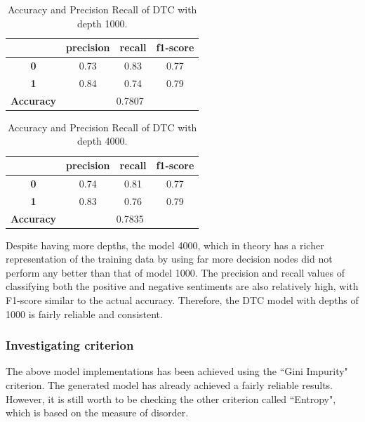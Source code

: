 \documentclass[a4paper]{report}
\begin{document}
{{\begin{table}[h!]
\centering
\begin{tabular}{  c | c | c | c |}
\cline{2-4}
&  \textbf { precision } &  \textbf  { recall } & \textbf  { f1-score } \\
\hline
\multicolumn{1}{|c|}{ \textbf {0}} & 0.73 & 0.83 & 0.77 \\
\hline
\multicolumn{1}{|c|}{ \textbf {1}} & 0.84 & 0.74 & 0.79 \\
\hline
\hline
\multicolumn{1}{|c|}{ \textbf {Accuracy}} & \multicolumn{3}{|c|}{0.7807} \\
\hline
\end{tabular}
\caption{Accuracy and Precision Recall of DTC with depth 1000.}
\label{table:DTC_depth_1000_performance}
\end{table}


\begin{table}[h!]
\centering
\begin{tabular}{  c | c | c | c |}
\cline{2-4}
&  \textbf { precision } &  \textbf  { recall } & \textbf  { f1-score }  \\
\hline
\multicolumn{1}{|c|}{ \textbf {0}} & 0.74 & 0.81 & 0.77 \\
\hline
\multicolumn{1}{|c|}{ \textbf {1}} & 0.83 & 0.76 & 0.79 \\
\hline
\hline
\multicolumn{1}{|c|}{ \textbf {Accuracy}} & \multicolumn{3}{|c|}{0.7835} \\
\hline
\end{tabular}
\caption{Accuracy and Precision Recall of DTC with depth 4000.}
\label{table:DTC_depth_4000_performance}
\end{table}

\noindent
Despite having more depths, the model 4000, which in theory has a richer representation of the training data by using far more decision nodes did not perform any better than that of model 1000. The precision and recall values of classifying both the positive and negative sentiments are also relatively high, with F1-score similar to the actual accuracy. Therefore, the DTC model with depths of 1000 is fairly reliable and consistent.

\subsubsection{Investigating criterion}
The above model implementations has been achieved using the “Gini Impurity" criterion. The generated model has already achieved a fairly reliable results. However, it is still worth to be checking the other criterion called “Entropy", which is based on the measure of disorder. 

}}
\end{document}

